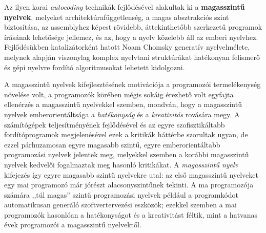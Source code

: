 Az ilyen korai \textit{autocoding} technikák fejlődésével alakultak ki a \textbf{magasszintű nyelvek}, melyeket architektúrafüggetlenség, a magas absztrakciós szint biztosítása, az assemblyhez képest rövidebb, áttekinthetőbb szerkezetű programok írásának lehetősége jellemez, és az, hogy a nyelv közelebb áll az emberi nyelvhez.
Fejlődésükben katalizátorként hatott Noam Chomsky generatív nyelvelmélete, melynek alapján viszonylag komplex nyelvtani struktúrákat hatékonyan felismerő és gépi nyelvre fordító algoritmusokat lehetett kidolgozni.

A magasszintű nyelvek kifejlesztésének motivációja a programozói termelékenység növelése volt\cite{Backus78}, a programozók körében mégis sokáig érezhető volt egyfajta ellenérzés a magasszintű nyelvekkel szemben, mondván, hogy a magasszintű nyelvek emberorientáltsága a \textit{hatékonyság} és a \textit{kreativitás} rovására megy\cite[12.~fejezet]{MythManMonth}.
A számítógépek teljesítményének fejlődésével és az egyre szofisztikáltabb fordítóprogramok megjelenésével ezek a kritikák háttérbe szorultak ugyan, de ezzel párhuzamosan egyre magasabb szintű, egyre emberorientáltabb programozási nyelvek jelentek meg, melyekkel szemben a korábbi magasszintű nyelvek kedvelői fogalmaztak meg hasonló kritikákat.
A \textit{magasszintű nyelv} kifejezés így egyre magasabb szintű nyelvekre utal: az első magasszintű nyelveket egy mai programozó már jórészt alacsonyszintűnek tekinti.
A ma programozója számára ,,túl magas'' szintű programozási nyelvek például a programkódot automatikusan generáló szoftvertervezési eszközök; ezekkel szemben a mai programozók hasonlóan a hatékonyságot és a kreativitást féltik, mint a hatvanas évek programozói a magasszintű nyelvektől.\cite{Veto}


